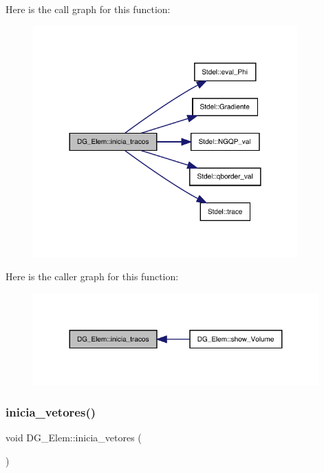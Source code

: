 Here is the call graph for this function\+:
\nopagebreak
\begin{figure}[H]
\begin{center}
\leavevmode
\includegraphics[width=288pt]{classDG__Elem_a33d01f96cc0d00b6a1a1d4a817724b4c_cgraph}
\end{center}
\end{figure}
Here is the caller graph for this function\+:
\nopagebreak
\begin{figure}[H]
\begin{center}
\leavevmode
\includegraphics[width=311pt]{classDG__Elem_a33d01f96cc0d00b6a1a1d4a817724b4c_icgraph}
\end{center}
\end{figure}
\mbox{\label{classDG__Elem_ac1ec1f962d6e1852f0adb01048c4c1f9}} 
\subsubsection{\texorpdfstring{inicia\+\_\+vetores()}{inicia\_vetores()}}
{\footnotesize\ttfamily void D\+G\+\_\+\+Elem\+::inicia\+\_\+vetores (\begin{DoxyParamCaption}{ }\end{DoxyParamCaption})}



